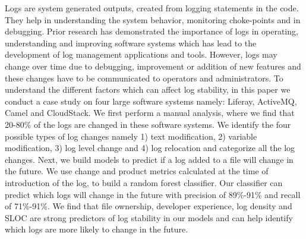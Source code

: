 Logs are system generated outputs, created from logging statements in the code. They help in understanding the system behavior, monitoring choke-points and in debugging. Prior research has demonstrated the importance of logs in operating, understanding and improving software systems which has lead to the development of log management applications and tools. However, logs may change over time due to debugging, improvement or addition of new features and these changes have to be communicated to operators and administrators. To understand the different factors which can affect log stability, in this paper we conduct a case study on four large software systems namely: Liferay, ActiveMQ, Camel and CloudStack. We first perform a manual analysis, where we find that 20-80\% of the logs are changed in these software systems. We identify the four possible types of log changes namely 1) text modification, 2) variable modification, 3) log level change and 4) log relocation and categorize all the log changes. Next, we build models to predict if a log added to a file will change in the future. We use change and product  metrics calculated at the time of introduction of the log, to build a random forest classifier. Our classifier can predict which logs will change in the future with precision of 89\%-91\% and recall of 71\%-91\%. We find that file ownership, developer experience, log density and SLOC are strong predictors of log stability in our models and can help identify which logs are more likely to change in the future.

